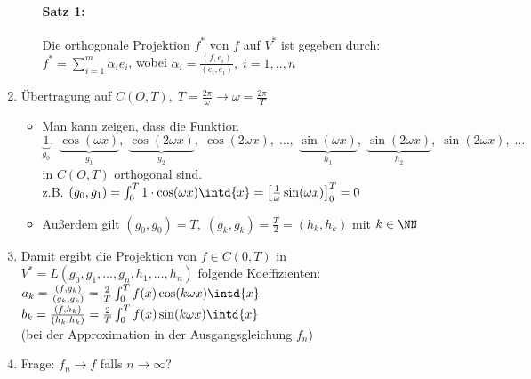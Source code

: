 \begin{enumerate}
\begin{itemize}
\paragraph{Satz 1:} Die orthogonale Projektion $f^*$ von $f$ auf $V^*$ ist gegeben durch: $f^* = \sum_{i=1}^m \alpha_i e_i$, wobei $\alpha_i=\frac{(f,e_i)}{(e_i,e_i)}, \; i=1,..,n$
\end{itemize}
\item Übertragung auf $C(O,T), \; T=\frac{2\pi}{\omega} \to \omega = \frac{2\pi}{T}$
\begin{itemize}
\item Man kann zeigen, dass die Funktion\\
$\underbrace{1}_{g_0},\; \underbrace{\cos(\omega x)}_{g_1},\; \underbrace{\cos(2\omega x)}_{g_2},\; \cos (2\omega x) ,\; \dots ,\; \underbrace{\sin (\omega x)}_{h_1},\; \underbrace{\sin(2\omega x)}_{h_2},\; \sin(2\omega x ),\; \dots$\\
in $C(O,T)$ orthogonal sind.\\
z.B. $(g_0, g_1) = \int_0^T 1 \cdot \cos (\omega x) \intd{x}=\left[ \frac{1}{\omega }\sin (\omega x) \right]_0^T=0$
\item Außerdem gilt $(g_0, g_0) = T ,\; (g_k, g_k) = \frac{T}{2}=(h_k, h_k)$ mit $k\in \NN$
\end{itemize}
\item Damit ergibt die Projektion von $f \in C(0,T)$ in $V^*=L(g_0,g_1, \dots, g_n, h_1, \dots, h_n)$ folgende Koeffizienten:\\
$a_k = \frac{(f, g_k)}{(g_k, g_k)}=\frac{2}{T}\int_0^T f(x) \cos(k \omega x) \intd{x}$\\
$b_k = \frac{(f, h_k)}{(h_k, h_k)}=\frac{2}{T}\int_0^T f(x) \sin(k \omega x) \intd{x}$\\
(bei der Approximation in der Ausgangsgleichung $f_n$)
\item Frage: $f_n\to f$ falls $n\to \infty$?

\end{enumerate}
